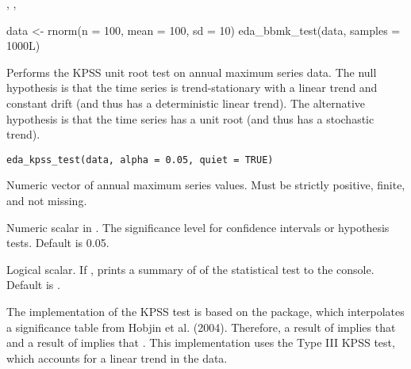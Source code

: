 \documentclass[a4paper]{book}
\begin{document}
%
\begin{SeeAlso}
, , 
\end{SeeAlso}
%
\begin{Examples}
\begin{ExampleCode}
data <- rnorm(n = 100, mean = 100, sd = 10)
eda_bbmk_test(data, samples = 1000L)

\end{ExampleCode}
\end{Examples}
%
\begin{Description}
Performs the KPSS unit root test on annual maximum series data.
The null hypothesis is that the time series is trend-stationary with a linear
trend and constant drift (and thus has a deterministic linear trend). The
alternative hypothesis is that the time series has a unit root (and thus
has a stochastic trend).
\end{Description}
%
\begin{Usage}
\begin{verbatim}
eda_kpss_test(data, alpha = 0.05, quiet = TRUE)
\end{verbatim}
\end{Usage}
%
\begin{Arguments}
\begin{ldescription}
\item[\code{data}] Numeric vector of annual maximum series values.
Must be strictly positive, finite, and not missing.

\item[\code{alpha}] Numeric scalar in \eqn{[0.01, 0.1]}{}. The significance
level for confidence intervals or hypothesis tests. Default is 0.05.

\item[\code{quiet}] Logical scalar. If , prints a summary of of the statistical
test to the console. Default is .
\end{ldescription}
\end{Arguments}
%
\begin{Details}
The implementation of the KPSS test is based on the  package, which
interpolates a significance table from Hobjin et al. (2004). Therefore, a result
of  implies that  and a result of 
implies that . This implementation uses the Type III KPSS test,
which accounts for a linear trend in the data.
\end{Details}
\end{document}
